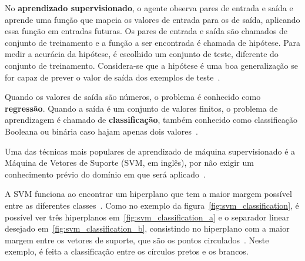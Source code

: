 No \textbf{aprendizado supervisionado}, o agente observa pares de entrada e saída e aprende uma função que mapeia os valores de entrada para os de saída, aplicando essa função em entradas futuras. Os pares de entrada e saída são chamados de conjunto de treinamento e a função a ser encontrada é chamada de hipótese. Para medir a acurácia da hipótese, é escolhido um conjunto de teste, diferente do conjunto de treinamento. Considera-se que a hipótese é uma boa generalização se for capaz de prever o valor de saída dos exemplos de teste~\cite{russell:2010}.

Quando os valores de saída são números, o problema é conhecido como \textbf{regressão}. Quando a saída é um conjunto de valores finitos, o problema de aprendizagem é chamado de \textbf{classificação}, também conhecido como classificação Booleana ou binária caso hajam apenas dois valores~\cite{russell:2010}.

Uma das técnicas mais populares de aprendizado de máquina supervisionado é a Máquina de Vetores de Suporte (SVM, em inglês), por não exigir um conhecimento prévio do domínio em que será aplicado~\cite{russell:2010}.

A SVM funciona ao encontrar um hiperplano que tem a maior margem possível entre as diferentes classes~\cite{hearst:1998}. Como no exemplo da figura~\ref{fig:svm_classification}, é possível ver três hiperplanos em~\ref{fig:svm_classification_a} e o separador linear desejado em~\ref{fig:svm_classification_b}, consistindo no hiperplano com a maior margem entre os vetores de suporte, que são os pontos circulados~\cite{russell:2010}. Neste exemplo, é feita a classificação entre os círculos pretos e os brancos.

